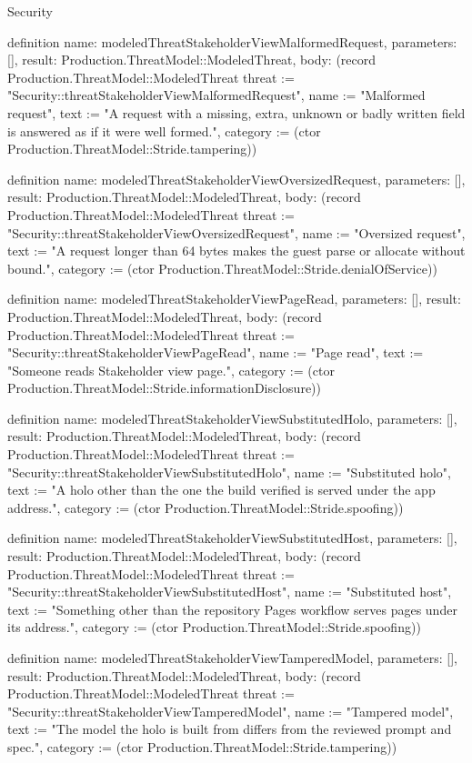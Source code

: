 \begin{lexlean}{Security}
\begin{semanticmodule}
definition{
  name: modeledThreatStakeholderViewMalformedRequest,
  parameters: [],
  result: Production.ThreatModel::ModeledThreat,
  body: (record Production.ThreatModel::ModeledThreat {threat := "Security::threatStakeholderViewMalformedRequest", name := "Malformed request", text := "A request with a missing, extra, unknown or badly written field is answered as if it were well formed.", category := (ctor Production.ThreatModel::Stride.tampering)})
}

definition{
  name: modeledThreatStakeholderViewOversizedRequest,
  parameters: [],
  result: Production.ThreatModel::ModeledThreat,
  body: (record Production.ThreatModel::ModeledThreat {threat := "Security::threatStakeholderViewOversizedRequest", name := "Oversized request", text := "A request longer than 64 bytes makes the guest parse or allocate without bound.", category := (ctor Production.ThreatModel::Stride.denialOfService)})
}

definition{
  name: modeledThreatStakeholderViewPageRead,
  parameters: [],
  result: Production.ThreatModel::ModeledThreat,
  body: (record Production.ThreatModel::ModeledThreat {threat := "Security::threatStakeholderViewPageRead", name := "Page read", text := "Someone reads Stakeholder view page.", category := (ctor Production.ThreatModel::Stride.informationDisclosure)})
}

definition{
  name: modeledThreatStakeholderViewSubstitutedHolo,
  parameters: [],
  result: Production.ThreatModel::ModeledThreat,
  body: (record Production.ThreatModel::ModeledThreat {threat := "Security::threatStakeholderViewSubstitutedHolo", name := "Substituted holo", text := "A holo other than the one the build verified is served under the app address.", category := (ctor Production.ThreatModel::Stride.spoofing)})
}

definition{
  name: modeledThreatStakeholderViewSubstitutedHost,
  parameters: [],
  result: Production.ThreatModel::ModeledThreat,
  body: (record Production.ThreatModel::ModeledThreat {threat := "Security::threatStakeholderViewSubstitutedHost", name := "Substituted host", text := "Something other than the repository Pages workflow serves pages under its address.", category := (ctor Production.ThreatModel::Stride.spoofing)})
}

definition{
  name: modeledThreatStakeholderViewTamperedModel,
  parameters: [],
  result: Production.ThreatModel::ModeledThreat,
  body: (record Production.ThreatModel::ModeledThreat {threat := "Security::threatStakeholderViewTamperedModel", name := "Tampered model", text := "The model the holo is built from differs from the reviewed prompt and spec.", category := (ctor Production.ThreatModel::Stride.tampering)})
}


\end{semanticmodule}
\end{lexlean}
